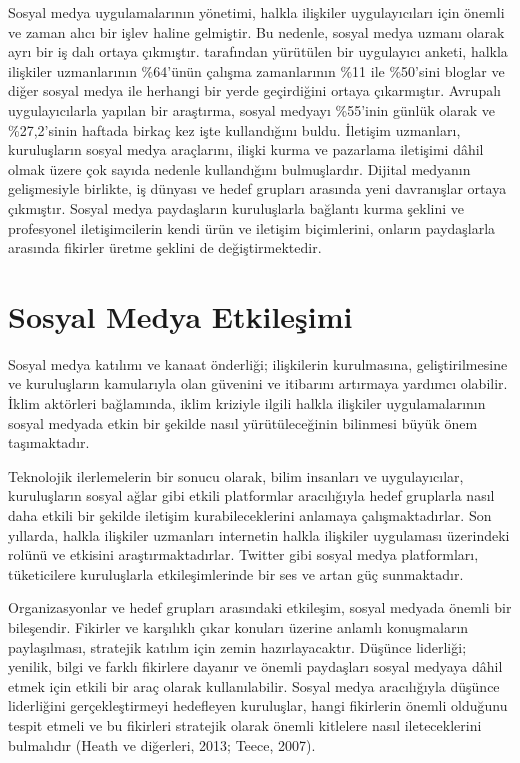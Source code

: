 \documentclass[
]{book}
\begin{document}
Sosyal medya uygulamalarının yönetimi, halkla ilişkiler uygulayıcıları için önemli ve zaman alıcı bir işlev haline gelmiştir. Bu nedenle, sosyal medya uzmanı olarak ayrı bir iş dalı ortaya çıkmıştır. \citet{wright2017tracking} tarafından yürütülen bir uygulayıcı anketi, halkla ilişkiler uzmanlarının \%64'ünün çalışma zamanlarının \%11 ile \%50'sini bloglar ve diğer sosyal medya ile herhangi bir yerde geçirdiğini ortaya çıkarmıştır. Avrupalı uygulayıcılarla yapılan bir araştırma, sosyal medyayı \%55'inin günlük olarak ve \%27,2'sinin haftada birkaç kez işte kullandığını buldu. \citep{moreno2015does} İletişim uzmanları, kuruluşların sosyal medya araçlarını, ilişki kurma \citep{cho2014} ve pazarlama iletişimi \citep{estanyol2012marketing} dâhil olmak üzere çok sayıda nedenle kullandığını bulmuşlardır. Dijital medyanın gelişmesiyle birlikte, iş dünyası ve hedef grupları arasında yeni davranışlar ortaya çıkmıştır. Sosyal medya paydaşların kuruluşlarla bağlantı kurma şeklini ve profesyonel iletişimcilerin kendi ürün ve iletişim biçimlerini, onların paydaşlarla arasında fikirler üretme şeklini de değiştirmektedir. \citep{thelen2021dialogic, young2013thought}

\hypertarget{sosyal-medya-etkileux15fimi}{%
\section{Sosyal Medya Etkileşimi}\label{sosyal-medya-etkileux15fimi}}

Sosyal medya katılımı ve kanaat önderliği; ilişkilerin kurulmasına, geliştirilmesine ve kuruluşların kamularıyla olan güvenini ve itibarını artırmaya yardımcı olabilir. İklim aktörleri bağlamında, iklim kriziyle ilgili halkla ilişkiler uygulamalarının sosyal medyada etkin bir şekilde nasıl yürütüleceğinin bilinmesi büyük önem taşımaktadır.

Teknolojik ilerlemelerin bir sonucu olarak, bilim insanları ve uygulayıcılar, kuruluşların sosyal ağlar gibi etkili platformlar aracılığıyla hedef gruplarla nasıl daha etkili bir şekilde iletişim kurabileceklerini anlamaya çalışmaktadırlar. Son yıllarda, halkla ilişkiler uzmanları internetin halkla ilişkiler uygulaması üzerindeki rolünü ve etkisini araştırmaktadırlar. Twitter gibi sosyal medya platformları, tüketicilere kuruluşlarla etkileşimlerinde bir ses ve artan güç sunmaktadır.

Organizasyonlar ve hedef grupları arasındaki etkileşim, sosyal medyada önemli bir bileşendir. \citep{rybalko2010dialogic} Fikirler ve karşılıklı çıkar konuları üzerine anlamlı konuşmaların paylaşılması, stratejik katılım için zemin hazırlayacaktır. Düşünce liderliği; yenilik, bilgi ve farklı fikirlere dayanır \citep{mccrimmon2005thought} ve önemli paydaşları sosyal medyaya dâhil etmek için etkili bir araç olarak kullanılabilir. Sosyal medya aracılığıyla düşünce liderliğini gerçekleştirmeyi hedefleyen kuruluşlar, hangi fikirlerin önemli olduğunu tespit etmeli ve bu fikirleri stratejik olarak önemli kitlelere nasıl ileteceklerini bulmalıdır (Heath ve diğerleri, 2013; Teece, 2007).
\end{document}
